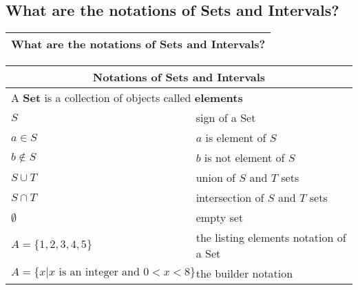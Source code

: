 \subsection{What are the notations of Sets and Intervals?}

\begin{small}
    \begin{tabularx}{1\textwidth}{
        p{}
    }
    \toprule
    \textbf{What are the notations of Sets and Intervals?}
    \\
    \bottomrule
    \end{tabularx}
\end{small}

\begin{small}
\begin{tabularx}{1\textwidth}{
        p{}
        p{}
    }
    \toprule
    \multicolumn{2}{c}{\textbf{Notations of Sets and Intervals}} \\
    \midrule
    \multicolumn{2}{l}{
        A \textbf{Set} is a collection of objects called \textbf{elements}
    } \\
    \midrule
    $S$ & sign of a Set \\
    \midrule
    $a \in S$ & $a$ is element of $S$ \\
    \midrule
    $b \notin S$  & $b$ is not element of $S$ \\
    \midrule
    $S \cup T$  & union of $S$ and $T$ sets \\
    \midrule
    $S \cap T$ & intersection of $S$ and $T$ sets \\
    \midrule
    $\emptyset$ & empty set \\
    \midrule
    $A = \{1, 2, 3, 4, 5\}$ & the listing elements notation of a Set \\
    \midrule
    $ A = \{x | x \text{ is an integer and } 0 < x < 8 \}$ &
    the builder notation \\
    \bottomrule
\end{tabularx}
\end{small}
